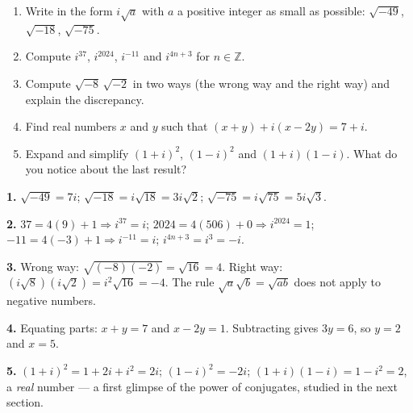 \documentclass[11pt]{article}
\begin{document}
\begin{exercice}[Consolidation]
\begin{enumerate}
\item Write in the form $i\sqrt{a}$ with $a$ a positive integer as small as possible: $\sqrt{-49}$, $\sqrt{-18}$, $\sqrt{-75}$.
\item Compute $i^{37}$, $i^{2024}$, $i^{-11}$ and $i^{4n+3}$ for $n \in \mathbb{Z}$.
\item Compute $\sqrt{-8}\,\sqrt{-2}$ in two ways (the wrong way and the right way) and explain the discrepancy.
\item Find real numbers $x$ and $y$ such that $(x + y) + i(x - 2y) = 7 + i$.
\item Expand and simplify $(1 + i)^{2}$, $(1 - i)^{2}$ and $(1 + i)(1 - i)$. What do you notice about the last result?
\end{enumerate}
\end{exercice}

\begin{corrige}[Exercise 1]
\textbf{1.} $\sqrt{-49} = 7i$; $\sqrt{-18} = i\sqrt{18} = 3i\sqrt{2}$; $\sqrt{-75} = i\sqrt{75} = 5i\sqrt{3}$.

\textbf{2.} $37 = 4(9)+1 \Rightarrow i^{37} = i$; $2024 = 4(506)+0 \Rightarrow i^{2024} = 1$; $-11 = 4(-3)+1 \Rightarrow i^{-11} = i$; $i^{4n+3} = i^{3} = -i$.

\textbf{3.} Wrong way: $\sqrt{(-8)(-2)} = \sqrt{16} = 4$. Right way: $(i\sqrt{8})(i\sqrt{2}) = i^{2}\sqrt{16} = -4$. The rule $\sqrt{a}\sqrt{b}=\sqrt{ab}$ does not apply to negative numbers.

\textbf{4.} Equating parts: $x + y = 7$ and $x - 2y = 1$. Subtracting gives $3y = 6$, so $y = 2$ and $x = 5$.

\textbf{5.} $(1+i)^{2} = 1 + 2i + i^{2} = 2i$; $(1-i)^{2} = -2i$; $(1+i)(1-i) = 1 - i^{2} = 2$, a \emph{real} number --- a first glimpse of the power of conjugates, studied in the next section.
\end{corrige}
\end{document}
